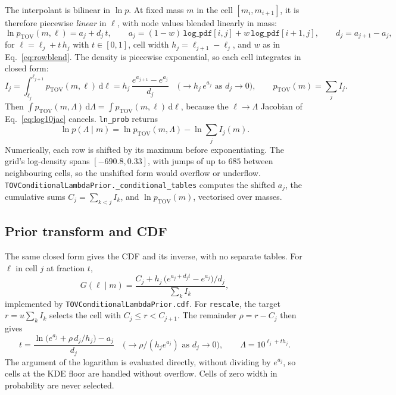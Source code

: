 \documentclass[11pt,a4paper]{article}
\newcommand{\dd}{\mathrm{d}}
\newcommand{\code}[1]{\texttt{#1}}
\begin{document}
The interpolant is bilinear in $\ln p$. At fixed mass $m$ in the cell
$[m_i, m_{i+1}]$, it is therefore piecewise \emph{linear} in $\ell$, with node
values blended linearly in mass:
\begin{equation}
  \ln p_{\mathrm{TOV}}(m, \ell) = a_j + d_j\, t,
  \qquad
  a_j = (1-w)\,\code{log\_pdf}[i, j] + w\,\code{log\_pdf}[i+1, j],
  \qquad
  d_j = a_{j+1} - a_j,
  \label{eq:rowlinear}
\end{equation}
for $\ell = \ell_j + t\,h_j$ with $t \in [0, 1]$, cell width
$h_j = \ell_{j+1} - \ell_j$, and $w$ as in Eq.~\eqref{eq:rowblend}. The density
is piecewise exponential, so each cell integrates in closed form:
\begin{equation}
  I_j = \int_{\ell_j}^{\ell_{j+1}} p_{\mathrm{TOV}}(m, \ell)\,\dd\ell
      = h_j\,\frac{e^{a_{j+1}} - e^{a_j}}{d_j}
  \quad\big(\to h_j\, e^{a_j} \text{ as } d_j \to 0\big),
  \qquad
  p_{\mathrm{TOV}}(m) = \sum_j I_j .
  \label{eq:cellint}
\end{equation}
Then $\int p_{\mathrm{TOV}}(m,\Lambda)\,\dd\Lambda = \int p_{\mathrm{TOV}}(m,\ell)\,\dd\ell$,
because the $\ell \to \Lambda$ Jacobian of Eq.~\eqref{eq:log10jac} cancels.
\code{ln\_prob} returns
\begin{equation}
  \ln p(\Lambda \mid m) = \ln p_{\mathrm{TOV}}(m, \Lambda) - \ln \sum_j I_j(m) .
\end{equation}
Numerically, each row is shifted by its maximum before exponentiating. The
grid's log-density spans $[-690.8, 0.33]$, with jumps of up to $685$ between
neighbouring cells, so the unshifted form would overflow or underflow.
\code{TOVConditionalLambdaPrior.\_conditional\_tables} computes the shifted
$a_j$, the cumulative sums $C_j = \sum_{k<j} I_k$, and $\ln p_{\mathrm{TOV}}(m)$,
vectorised over masses.

\subsection{Prior transform and CDF}

The same closed form gives the CDF and its inverse, with no separate tables.
For $\ell$ in cell $j$ at fraction $t$,
\begin{equation}
  G(\ell \mid m) = \frac{C_j + h_j\,\big(e^{a_j + d_j t} - e^{a_j}\big)/d_j}{\sum_k I_k},
  \label{eq:condcdf_exact}
\end{equation}
implemented by \code{TOVConditionalLambdaPrior.cdf}. For \code{rescale}, the
target $r = u \sum_k I_k$ selects the cell with $C_j \le r < C_{j+1}$. The
remainder $\rho = r - C_j$ then gives
\begin{equation}
  t = \frac{\ln\!\big(e^{a_j} + \rho\, d_j / h_j\big) - a_j}{d_j}
  \quad\big(\to \rho / (h_j e^{a_j}) \text{ as } d_j \to 0\big),
  \qquad
  \Lambda = 10^{\ell_j + t h_j} .
  \label{eq:condinv}
\end{equation}
The argument of the logarithm is evaluated directly, without dividing by
$e^{a_j}$, so cells at the KDE floor are handled without overflow. Cells of
zero width in probability are never selected.
\end{document}
